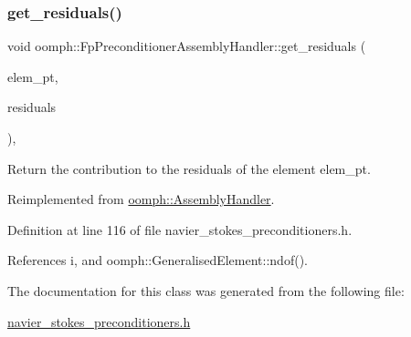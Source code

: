 \mbox{\label{classoomph_1_1FpPreconditionerAssemblyHandler_adfebe7f48f6fc715c258e1733218b12b}} 
\subsubsection{\texorpdfstring{get\+\_\+residuals()}{get\_residuals()}}
{\footnotesize\ttfamily void oomph\+::\+Fp\+Preconditioner\+Assembly\+Handler\+::get\+\_\+residuals (\begin{DoxyParamCaption}\item[{\hyperlink{classoomph_1_1GeneralisedElement}{Generalised\+Element} $\ast$const \&}]{elem\+\_\+pt,  }\item[{\hyperlink{classoomph_1_1Vector}{Vector}$<$ double $>$ \&}]{residuals }\end{DoxyParamCaption})\hspace{0.3cm}{\ttfamily [inline]}, {\ttfamily [virtual]}}



Return the contribution to the residuals of the element elem\+\_\+pt. 



Reimplemented from \hyperlink{classoomph_1_1AssemblyHandler_a7a6203b0ab90da62b4da2af8a26d08b3}{oomph\+::\+Assembly\+Handler}.



Definition at line 116 of file navier\+\_\+stokes\+\_\+preconditioners.\+h.



References i, and oomph\+::\+Generalised\+Element\+::ndof().



The documentation for this class was generated from the following file\+:\begin{DoxyCompactItemize}
\item 
\hyperlink{navier__stokes__preconditioners_8h}{navier\+\_\+stokes\+\_\+preconditioners.\+h}\end{DoxyCompactItemize}
